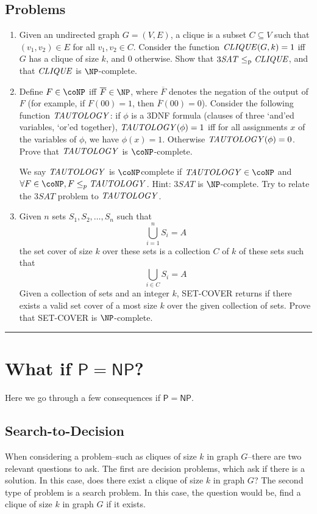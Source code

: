 \documentclass[10pt]{article}
\newcommand{\pred}{\leq_\text{p}}
\newcommand{\Line}{\vspace{.3cm}\hrule\vspace{.3cm}}
\newcommand{\TSAT}{3\mathit{SAT}}
\begin{document}
\subsection{Problems}
\begin{enumerate}
\item Given an undirected graph $G=(V,E)$, a clique is a subset $C \subseteq V$ such that $(v_1,v_2) \in E$ for all $v_1,v_2 \in C$. Consider the function $\mathit{CLIQUE}(G,k)=1$ iff $G$ has a clique of size $k$, and $0$ otherwise. Show that $\TSAT \pred \CLIQUE$, and that $\mathit{CLIQUE}$ is $\NP$-complete.


\item Define $F \in \coNP$ iff $\overline{F} \in \NP$, where $\overline{F}$ denotes the negation of the output of $F$ (for example, if $F(00)=1$, then $\overline{F}(00)=0$). Consider the following function $\mathit{TAUTOLOGY}$: if $\phi$ is a 3DNF formula (clauses of three `and'ed variables, `or'ed together), $\mathit{TAUTOLOGY}(\phi)=1$ iff for all assignments $x$ of the variables of $\phi$, we have $\phi(x)=1$. Otherwise $\mathit{TAUTOLOGY}(\phi)=0$. Prove that $\mathit{TAUTOLOGY}$ is $\coNP$-complete.

We say $\mathit{TAUTOLOGY}$ is $\coNP$complete if $\TAUT \in \coNP$ and $\forall F\in \coNP, F\leq_p \TAUT$. Hint: $\TSAT$ is $\NP$-complete. Try to relate the $\TSAT$ problem to $\mathit{TAUTOLOGY}$.

\item Given $n$ sets $S_1, S_2, \ldots, S_n$ such that $$\bigcup_{i=1}^{n} S_i = A$$ the set cover of size $k$ over these sets is a collection $C$ of $k$ of these sets such that $$\bigcup_{i \in C} S_i = A$$ Given a collection of sets and an integer $k$, SET-COVER returns if there exists a valid set cover of a most size $k$ over the given collection of sets. Prove that SET-COVER is $\NP$-complete.


\end{enumerate}
\Line
\section{What if $\mathsf{P}=\mathsf{NP}$?}

Here we go through a few consequences if $\mathsf{P} = \mathsf{NP}$.
\subsection{Search-to-Decision}
When considering a problem--such as cliques of size $k$ in graph $G$--there are two relevant questions to ask. The first are decision problems, which ask if there is a solution. In this case, does there exist a clique of size $k$ in graph $G$? The second type of problem is a search problem. In this case, the question would be, find a clique of size $k$ in graph $G$ if it exists.
\end{document}
